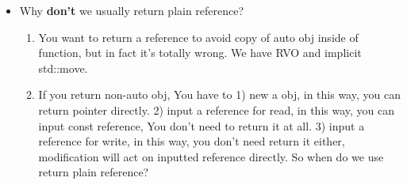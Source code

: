 \documentclass[a4paper,11pt,twoside]{book}
\begin{document}
\begin{itemize}
	\item Why \textbf{don't} we usually return plain reference?
	\begin{enumerate}
		\item You want to return a reference to avoid copy of auto obj inside of function, but in fact it's totally wrong. We have RVO and implicit std::move.

		\item If you return non-auto obj, You have to 1) new a obj, in this way, you can return pointer directly. 2) input a reference for read, in this way, you can input const reference, You don't need to return it at all. 3) input a reference for write, in this way, you don't need return it either, modification will act on inputted reference directly. So when do we use return plain reference?
	\end{enumerate}
	
\end{itemize}
\end{document}

